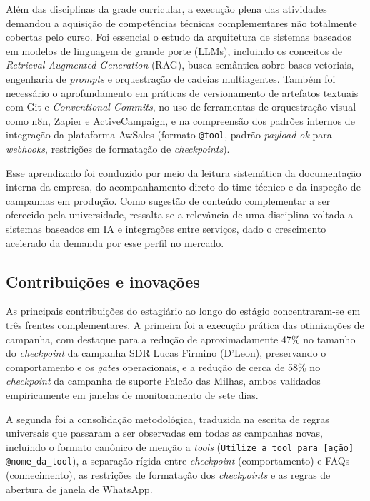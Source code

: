 \documentclass[12pt,a4paper,oneside]{article}
\begin{document}
Além das disciplinas da grade curricular, a execução plena das atividades demandou a aquisição de competências técnicas complementares não totalmente cobertas pelo curso. Foi essencial o estudo da arquitetura de sistemas baseados em modelos de linguagem de grande porte (LLMs), incluindo os conceitos de \textit{Retrieval-Augmented Generation} (RAG), busca semântica sobre bases vetoriais, engenharia de \textit{prompts} e orquestração de cadeias multiagentes. Também foi necessário o aprofundamento em práticas de versionamento de artefatos textuais com Git e \textit{Conventional Commits}, no uso de ferramentas de orquestração visual como n8n, Zapier e ActiveCampaign, e na compreensão dos padrões internos de integração da plataforma AwSales (formato \texttt{@tool}, padrão \textit{payload-ok} para \textit{webhooks}, restrições de formatação de \textit{checkpoints}).

Esse aprendizado foi conduzido por meio da leitura sistemática da documentação interna da empresa, do acompanhamento direto do time técnico e da inspeção de campanhas em produção. Como sugestão de conteúdo complementar a ser oferecido pela universidade, ressalta-se a relevância de uma disciplina voltada a sistemas baseados em IA e integrações entre serviços, dado o crescimento acelerado da demanda por esse perfil no mercado.

\subsection{Contribuições e inovações}

As principais contribuições do estagiário ao longo do estágio concentraram-se em três frentes complementares. A primeira foi a execução prática das otimizações de campanha, com destaque para a redução de aproximadamente 47\% no tamanho do \textit{checkpoint} da campanha SDR Lucas Firmino (D'Leon), preservando o comportamento e os \textit{gates} operacionais, e a redução de cerca de 58\% no \textit{checkpoint} da campanha de suporte Falcão das Milhas, ambos validados empiricamente em janelas de monitoramento de sete dias.

A segunda foi a consolidação metodológica, traduzida na escrita de regras universais que passaram a ser observadas em todas as campanhas novas, incluindo o formato canônico de menção a \textit{tools} (\texttt{Utilize a tool para [ação] @nome\_da\_tool}), a separação rígida entre \textit{checkpoint} (comportamento) e FAQs (conhecimento), as restrições de formatação dos \textit{checkpoints} e as regras de abertura de janela de WhatsApp.
\end{document}
